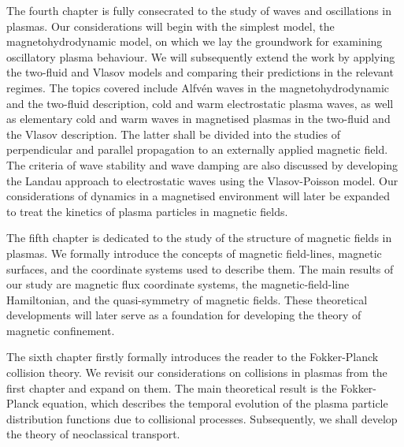 \quad The fourth chapter is fully consecrated to the study of waves and oscillations in plasmas. Our considerations will begin with the simplest model, the magnetohydrodynamic model, on which we lay the groundwork for examining oscillatory plasma behaviour. We will subsequently extend the work by applying the two-fluid and Vlasov models and comparing their predictions in the relevant regimes. The topics covered include Alfvén waves in the magnetohydrodynamic and the two-fluid description, cold and warm electrostatic plasma waves, as well as elementary cold and warm waves in magnetised plasmas in the two-fluid and the Vlasov description. The latter shall be divided into the studies of perpendicular and parallel propagation to an externally applied magnetic field. The criteria of wave stability and wave damping are also discussed by developing the Landau approach to electrostatic waves using the Vlasov-Poisson model. Our considerations of dynamics in a magnetised environment will later be expanded to treat the kinetics of plasma particles in magnetic fields. 

\quad The fifth chapter is dedicated to the study of the structure of magnetic fields in plasmas. We formally introduce the concepts of magnetic field-lines, magnetic surfaces, and the coordinate systems used to describe them. The main results of our study are magnetic flux coordinate systems, the magnetic-field-line Hamiltonian, and the quasi-symmetry of magnetic fields. These theoretical developments will later serve as a foundation for developing the theory of magnetic confinement.

\quad The sixth chapter firstly formally introduces the reader to the Fokker-Planck collision theory. We revisit our considerations on collisions in plasmas from the first chapter and expand on them. The main theoretical result is the Fokker-Planck equation, which describes the temporal evolution of the plasma particle distribution functions due to collisional processes. Subsequently, we shall develop the theory of neoclassical transport.

\newpage